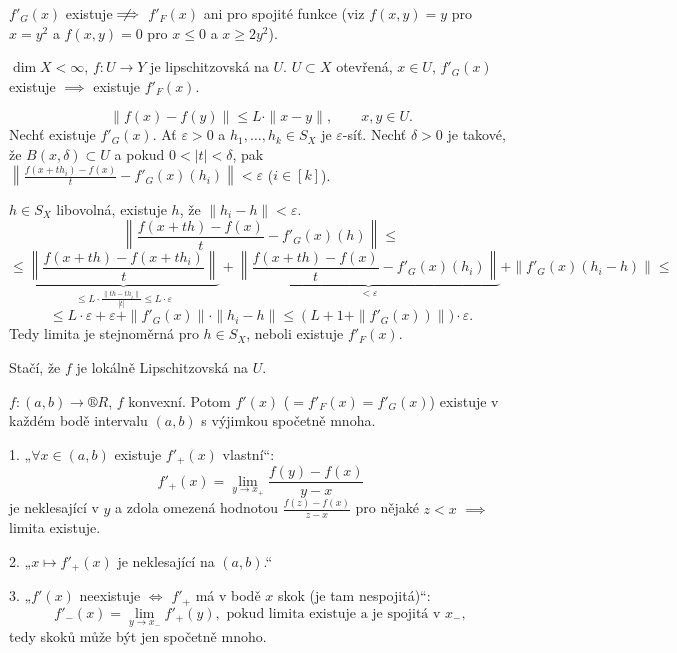 \documentclass[12pt]{article}					%
\begin{document}
\begin{poznamka}
	$f'_G(x)$ existuje $\;\not\nobreak\!\!\!\!\implies$ $f'_F(x)$ ani pro spojité funkce (viz $f(x, y) = y$ pro $x = y^2$ a $f(x, y) = 0$ pro $x ≤ 0$ a $x ≥ 2y^2$).
\end{poznamka}

\pagebreak

\begin{tvrzeni}
	$\dim X < ∞$, $f: U \rightarrow Y$ je lipschitzovská na $U$. $U \subset X$ otevřená, $x \in U$, $f'_G(x)$ existuje $\implies$ existuje $f'_F(x)$.

	\begin{dukazin}
		$$ \|f(x) - f(y)\| ≤ L·\|x - y\|, \qquad x, y \in U. $$
		Nechť existuje $f'_G(x)$. Ať $ε > 0$ a $h_1, …, h_k \in S_X$ je $ε$-síť. Nechť $δ > 0$ je takové, že $B(x, δ) \subset U$ a pokud $0 < |t| < δ$, pak $\left\|\frac{f(x + th_i) - f(x)}{t} - f'_G(x)(h_i)\right\| < ε$ ($i \in [k]$).

		$h \in S_X$ libovolná, existuje $h$, že $\|h_i - h\| < ε$.
		$$ \left\|\frac{f(x + th) - f(x)}{t} - f'_G(x)(h)\right\| ≤ $$
		$$ ≤ \underbrace{\left\|\frac{f(x + th) - f(x + th_i)}{t}\right\|}_{≤ L·\frac{\|th - th_i\|}{|t|} ≤ L·ε} + \underbrace{\left\|\frac{f(x + th) - f(x)}{t} - f'_G(x)(h_i)\right\|}_{<ε} + \|f'_G(x)(h_i - h)\| ≤ $$
		$$ ≤ L·ε + ε + \|f'_G(x)\|·\|h_i - h\| ≤ (L + 1 + \|f'_G(x))\|)·ε. $$
		Tedy limita je stejnoměrná pro $h \in S_X$, neboli existuje $f'_F(x)$.
	\end{dukazin}

	\begin{poznamkain}
		Stačí, že $f$ je lokálně Lipschitzovská na $U$.
	\end{poznamkain}
\end{tvrzeni}

\begin{tvrzeni}
	$f: (a, b) \rightarrow ®R$, $f$ konvexní. Potom $f'(x)$ ($ = f'_F(x) = f'_G(x)$) existuje v každém bodě intervalu $(a, b)$ s výjimkou spočetně mnoha.

	\begin{dukazin}
		1. „$\forall x \in (a, b)$ existuje $f'_+(x)$ vlastní“:
		$$ f'_+(x) = \lim_{y \rightarrow x_+} \frac{f(y) - f(x)}{y - x} $$
		je neklesající v $y$ a zdola omezená hodnotou $\frac{f(z) - f(x)}{z - x}$ pro nějaké $z < x$ $\implies$ limita existuje.

		2. „$x \mapsto f'_+(x)$ je neklesající na $(a, b)$.“

		3. „$f'(x)$ neexistuje $\Leftrightarrow$ $f'_+$ má v bodě $x$ skok (je tam nespojitá)“:
		$$ f'_-(x) = \lim_{y \rightarrow x_-} f'_+(y), \text{ pokud limita existuje a je spojitá v $x_-$}, $$
		tedy skoků může být jen spočetně mnoho.
	\end{dukazin}
\end{tvrzeni}
\end{document}
